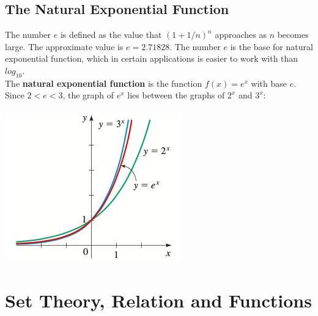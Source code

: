 \documentclass{book}
\begin{document}
	 \section{The Natural Exponential Function}
	 The number $e$ is defined as the value that $(1+1/n)^n$ approaches as $n$ becomes large. The approximate value is $e = 2.71828$. The number $e$ is the base for natural exponential function, which in certain applications is easier to work with than $log_{10}$. \\
	 The \textbf{natural exponential function} is the function $f(x) = e^x$ with base $e$. Since $2 < e < 3$, the graph of $e^x$ lies between the graphs of $2^x$ and $3^x$:\\
	 \\
	 \includegraphics[scale=0.8]{exp4}
	 
	 \chapter{Set Theory, Relation and Functions}
\end{document}
